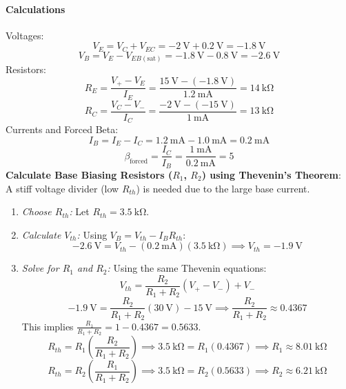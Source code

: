 \documentclass[12pt]{article}
\begin{document}
\paragraph{Calculations}
Voltages:
$$
V_E = V_C + V_{EC} = \SI{-2}{\volt} + \SI{0.2}{\volt} = \SI{-1.8}{\volt}
$$
$$
V_B = V_E - V_{EB(\text{sat})} = \SI{-1.8}{\volt} - \SI{0.8}{\volt} = \SI{-2.6}{\volt}
$$
Resistors:
$$
R_E = \frac{V_{+} - V_E}{I_E} = \frac{\SI{15}{\volt} - (\SI{-1.8}{\volt})}{\SI{1.2}{\milli\ampere}} = \SI{14}{\kilo\ohm}
$$
$$
R_C = \frac{V_C - V_{-}}{I_C} = \frac{\SI{-2}{\volt} - (\SI{-15}{\volt})}{\SI{1}{\milli\ampere}} = \SI{13}{\kilo\ohm}
$$
Currents and Forced Beta:
$$
I_B = I_E - I_C = \SI{1.2}{\milli\ampere} - \SI{1.0}{\milli\ampere} = \SI{0.2}{\milli\ampere}
$$
$$
\beta_{\text{forced}} = \frac{I_C}{I_B} = \frac{\SI{1}{\milli\ampere}}{\SI{0.2}{\milli\ampere}} = 5
$$
\textbf{Calculate Base Biasing Resistors ($R_1$, $R_2$) using Thevenin's Theorem}:\\
A stiff voltage divider (low $R_{th}$) is needed due to the large base current.
\begin{enumerate}
    \item \textit{Choose $R_{th}$:} Let $R_{th} = \SI{3.5}{\kilo\ohm}$.
    \item \textit{Calculate $V_{th}$:} Using $V_B = V_{th} - I_B R_{th}$:
    $$
    \SI{-2.6}{\volt} = V_{th} - (\SI{0.2}{\milli\ampere})(\SI{3.5}{\kilo\ohm}) \implies V_{th} = \SI{-1.9}{\volt}
    $$
    \item \textit{Solve for $R_1$ and $R_2$:} Using the same Thevenin equations:
    $$ V_{th} = \frac{R_2}{R_1+R_2}(V_+ - V_-) + V_- $$
    $$ \SI{-1.9}{\volt} = \frac{R_2}{R_1+R_2}(\SI{30}{\volt}) - \SI{15}{\volt} \implies \frac{R_2}{R_1+R_2} \approx 0.4367 $$
    This implies $\frac{R_1}{R_1+R_2} = 1 - 0.4367 = 0.5633$.
    $$ R_{th} = R_1 \left(\frac{R_2}{R_1+R_2}\right) \implies \SI{3.5}{\kilo\ohm} = R_1 (0.4367) \implies R_1 \approx \SI{8.01}{\kilo\ohm} $$
    $$ R_{th} = R_2 \left(\frac{R_1}{R_1+R_2}\right) \implies \SI{3.5}{\kilo\ohm} = R_2 (0.5633) \implies R_2 \approx \SI{6.21}{\kilo\ohm} $$
\end{enumerate}
\end{document}
